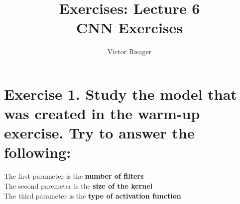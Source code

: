 \documentclass[a4paper]{article}
\title{Exercises: Lecture 6 \\
	\large CNN Exercises}
\author{Victor Risager}
\begin{document}
\maketitle

\section{Exercise 1. Study the model that was created in the warm-up exercise. Try to answer the following:}

The first parameter is the \textbf{number of filters} \\
The second paremeter is the \textbf{size of the kernel} \\
The third parameter is the \textbf{type of activation function} 
\end{document}
